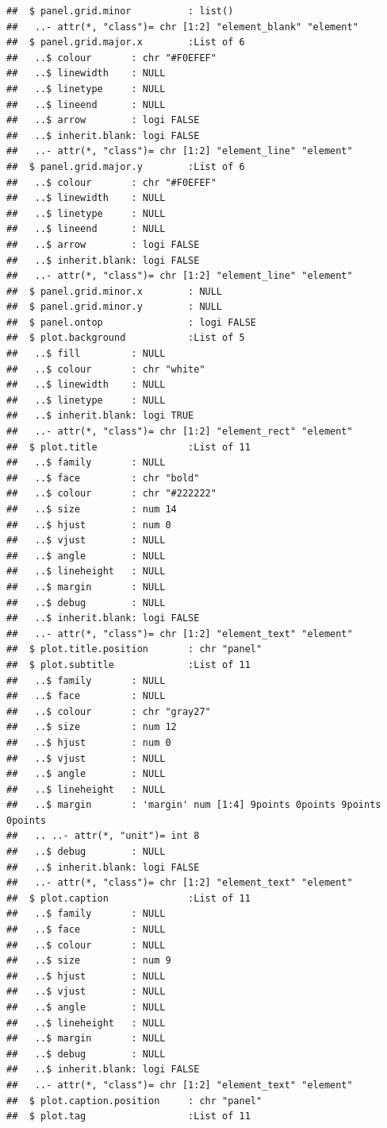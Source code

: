 \documentclass[12pt,preprint, authoryear]{elsarticle}
\numberwithin{equation}{section}
\numberwithin{figure}{section}
\numberwithin{table}{section}
\begin{document}
\begin{verbatim}
##  $ panel.grid.minor          : list()
##   ..- attr(*, "class")= chr [1:2] "element_blank" "element"
##  $ panel.grid.major.x        :List of 6
##   ..$ colour       : chr "#F0EFEF"
##   ..$ linewidth    : NULL
##   ..$ linetype     : NULL
##   ..$ lineend      : NULL
##   ..$ arrow        : logi FALSE
##   ..$ inherit.blank: logi FALSE
##   ..- attr(*, "class")= chr [1:2] "element_line" "element"
##  $ panel.grid.major.y        :List of 6
##   ..$ colour       : chr "#F0EFEF"
##   ..$ linewidth    : NULL
##   ..$ linetype     : NULL
##   ..$ lineend      : NULL
##   ..$ arrow        : logi FALSE
##   ..$ inherit.blank: logi FALSE
##   ..- attr(*, "class")= chr [1:2] "element_line" "element"
##  $ panel.grid.minor.x        : NULL
##  $ panel.grid.minor.y        : NULL
##  $ panel.ontop               : logi FALSE
##  $ plot.background           :List of 5
##   ..$ fill         : NULL
##   ..$ colour       : chr "white"
##   ..$ linewidth    : NULL
##   ..$ linetype     : NULL
##   ..$ inherit.blank: logi TRUE
##   ..- attr(*, "class")= chr [1:2] "element_rect" "element"
##  $ plot.title                :List of 11
##   ..$ family       : NULL
##   ..$ face         : chr "bold"
##   ..$ colour       : chr "#222222"
##   ..$ size         : num 14
##   ..$ hjust        : num 0
##   ..$ vjust        : NULL
##   ..$ angle        : NULL
##   ..$ lineheight   : NULL
##   ..$ margin       : NULL
##   ..$ debug        : NULL
##   ..$ inherit.blank: logi FALSE
##   ..- attr(*, "class")= chr [1:2] "element_text" "element"
##  $ plot.title.position       : chr "panel"
##  $ plot.subtitle             :List of 11
##   ..$ family       : NULL
##   ..$ face         : NULL
##   ..$ colour       : chr "gray27"
##   ..$ size         : num 12
##   ..$ hjust        : num 0
##   ..$ vjust        : NULL
##   ..$ angle        : NULL
##   ..$ lineheight   : NULL
##   ..$ margin       : 'margin' num [1:4] 9points 0points 9points 0points
##   .. ..- attr(*, "unit")= int 8
##   ..$ debug        : NULL
##   ..$ inherit.blank: logi FALSE
##   ..- attr(*, "class")= chr [1:2] "element_text" "element"
##  $ plot.caption              :List of 11
##   ..$ family       : NULL
##   ..$ face         : NULL
##   ..$ colour       : NULL
##   ..$ size         : num 9
##   ..$ hjust        : NULL
##   ..$ vjust        : NULL
##   ..$ angle        : NULL
##   ..$ lineheight   : NULL
##   ..$ margin       : NULL
##   ..$ debug        : NULL
##   ..$ inherit.blank: logi FALSE
##   ..- attr(*, "class")= chr [1:2] "element_text" "element"
##  $ plot.caption.position     : chr "panel"
##  $ plot.tag                  :List of 11

\end{verbatim}
\end{document}
